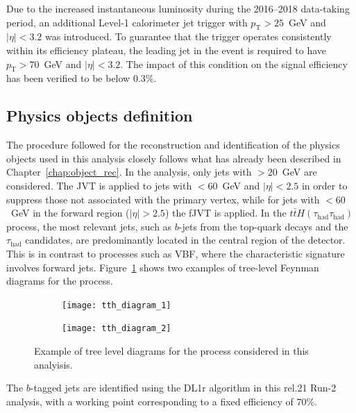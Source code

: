 Due to the increased instantaneous luminosity during the 2016--2018 data-taking period, an additional Level-1 calorimeter jet trigger with $p_{\text{T}} > 25$~GeV and $|\eta| < 3.2$ was introduced. To guarantee that the trigger operates consistently within its efficiency plateau, the leading jet in the event is required to have $p_{\text{T}} > 70$~GeV and $|\eta| < 3.2$. The impact of this condition on the signal efficiency has been verified to be below $0.3\%$.

\subsection{Physics objects definition}
\label{subsec:trigger_tth}

The procedure followed for the reconstruction and identification of the physics objects used in this analysis closely follows what has already been described in Chapter~\ref{chap:object_rec}.  
In the \ttHtt analysis, only jets with \pt$>20$~GeV are considered. The JVT is applied to jets with \pt$ < 60$~GeV and $|\eta| < 2.5$ in order to suppress those not associated with the primary vertex, while for jets with \pt$ < 60$~GeV in the forward region ($|\eta| > 2.5$) the fJVT is applied. In the $t\bar{t}H(\tau_{\text{had}}\tau_{\text{had}})$ process, the most relevant jets, such as $b$-jets from the top-quark decays and the $\tau_{\text{had}}$ candidates, are predominantly located in the central region of the detector. This is in contrast to processes such as VBF, where the characteristic signature involves forward jets. Figure~\ref{fig:tth_topo} shows two examples of tree-level Feynman diagrams for the \ttHtt process.
\begin{figure}[htbp]
    \centering
    \begin{subfigure}[b]{0.48\textwidth}
        \texttt{[image: tth\_diagram\_1]}
    \end{subfigure}
    \hfill
    \begin{subfigure}[b]{0.48\textwidth}
        \texttt{[image: tth\_diagram\_2]}
    \end{subfigure}
    \hfill
    \caption{Example of tree level diagrams for the \ttHtt process considered in this analyisis.}
    \label{fig:tth_topo}
\end{figure}
\FloatBarrier
The $b$-tagged jets are identified using the DL1r algorithm in this rel.21 Run-2 analysis, with a working point corresponding to a fixed efficiency of $70\%$.  

